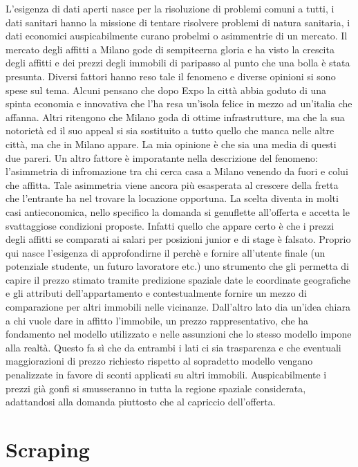 \documentclass[
  12pt,
  a4paper,
  oneside]{book}
\begin{document}
L'esigenza di dati aperti nasce per la risoluzione di problemi comuni a tutti, i dati sanitari hanno la missione di tentare risolvere problemi di natura sanitaria, i dati economici auspicabilmente curano probelmi o asimmentrie di un mercato. Il mercato degli affitti a Milano gode di sempiteerna gloria e ha visto la crescita degli affitti e dei prezzi degli immobili di paripasso al punto che una bolla è stata presunta. Diversi fattori hanno reso tale il fenomeno e diverse opinioni si sono spese sul tema. Alcuni pensano che dopo Expo la città abbia goduto di una spinta economia e innovativa che l'ha resa un'isola felice in mezzo ad un'italia che affanna. Altri ritengono che Milano goda di ottime infrastrutture, ma che la sua notorietà ed il suo appeal si sia sostituito a tutto quello che manca nelle altre città, ma che in Milano appare. La mia opinione è che sia una media di questi due pareri.
Un altro fattore è imporatante nella descrizione del fenomeno: l'asimmetria di infromazione tra chi cerca casa a Milano venendo da fuori e colui che affitta. Tale asimmetria viene ancora più esasperata al crescere della fretta che l'entrante ha nel trovare la locazione opportuna. La scelta diventa in molti casi antieconomica, nello specifico la domanda si genuflette all'offerta e accetta le svattaggiose condizioni proposte.
Infatti quello che appare certo è che i prezzi degli affitti se comparati ai salari per posizioni junior e di stage è falsato. Proprio qui nasce l'esigenza di approfondirne il perchè e fornire all'utente finale (un potenziale studente, un futuro lavoratore etc.) uno strumento che gli permetta di capire il prezzo stimato tramite predizione spaziale date le coordinate geografiche e gli attributi dell'appartamento e contestualmente fornire un mezzo di comparazione per altri immobili nelle vicinanze. Dall'altro lato dia un'idea chiara a chi vuole dare in affitto l'immobile, un prezzo rappresentativo, che ha fondamento nel modello utilizzato e nelle assunzioni che lo stesso modello impone alla realtà. Questo fa sì che da entrambi i lati ci sia trasparenza e che eventuali maggiorazioni di prezzo richiesto rispetto al sopradetto modello vengano penalizzate in favore di sconti applicati su altri immobili. Auspicabilmente i prezzi già gonfi si smusseranno in tutta la regione spaziale considerata, adattandosi alla domanda piuttosto che al capriccio dell'offerta.

\hypertarget{scraping}{%
\chapter{Scraping}\label{scraping}}
\end{document}
